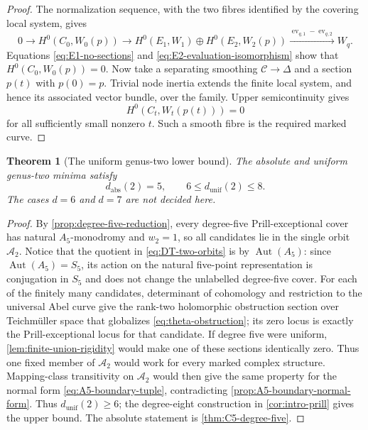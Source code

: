 \documentclass[11pt,reqno]{amsart}
\numberwithin{equation}{section}
\newtheorem{theorem}{Theorem}[section]
\theoremstyle{remark}
\begin{document}
\begin{proof}
The normalization sequence, with the two fibres identified by the
covering local system, gives
\[
 0\longrightarrow H^0(C_0,W_0(p))
 \longrightarrow H^0(E_1,W_1)\oplus H^0(E_2,W_2(p))
 \xrightarrow{\operatorname{ev}_{q,1}-\operatorname{ev}_{q,2}} W_q.
\tag{6.47}\label{eq:boundary-normalization-sequence}
\]
Equations \eqref{eq:E1-no-sections} and
\eqref{eq:E2-evaluation-isomorphism} show that
\(H^0(C_0,W_0(p))=0\).  Now take a separating smoothing
\(\mathcal C\to\Delta\) and a section \(p(t)\) with \(p(0)=p\).
Trivial node inertia extends the finite local system, and hence its
associated vector bundle, over the family.  Upper semicontinuity gives
\[
 H^0(C_t,W_t(p(t)))=0
\]
for all sufficiently small nonzero \(t\).  Such a smooth fibre is the
required marked curve.
\end{proof}

\begin{theorem}[The uniform genus-two lower bound]
\label{thm:uniform-genus-two-lower}
The absolute and uniform genus-two minima satisfy
\[
 \boxed{d_{\mathrm{abs}}(2)=5},
 \qquad
 \boxed{6\leq d_{\mathrm{unif}}(2)\leq8}.
\tag{6.48}\label{eq:genus-two-uniform-range}
\]
The cases \(d=6\) and \(d=7\) are not decided here.
\end{theorem}

\begin{proof}
By \cref{prop:degree-five-reduction}, every degree-five
Prill-exceptional cover has natural \(A_5\)-monodromy and \(w_2=1\), so
all candidates lie in the single orbit \(\mathcal A_2\).  Notice that the
quotient in \eqref{eq:DT-two-orbits} is by
\(\operatorname{Aut}(A_5)\): since
\(\operatorname{Aut}(A_5)=S_5\), its action on the natural five-point
representation is conjugation in \(S_5\) and does not change the
unlabelled degree-five cover.  For each of the finitely many candidates,
determinant of cohomology and restriction to the universal Abel curve
give the rank-two holomorphic obstruction section over Teichm\"uller
space that globalizes \eqref{eq:theta-obstruction}; its zero locus is
exactly the Prill-exceptional locus for that candidate.  If degree five
were uniform, \cref{lem:finite-union-rigidity} would make one of these
sections identically zero.  Thus one fixed member of \(\mathcal A_2\)
would work for every marked complex structure.  Mapping-class
transitivity on \(\mathcal A_2\) would
then give the same property for the normal form
\eqref{eq:A5-boundary-tuple}, contradicting
\cref{prop:A5-boundary-normal-form}.  Thus
\(d_{\mathrm{unif}}(2)\geq6\); the degree-eight construction in
\cref{cor:intro-prill} gives the upper bound.  The absolute statement is
\cref{thm:C5-degree-five}.
\end{proof}
\end{document}
